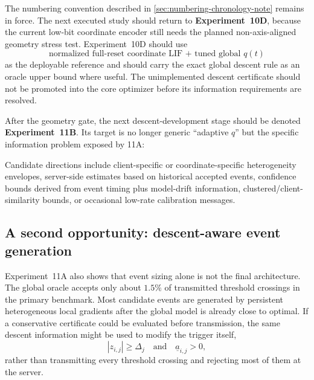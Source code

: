 The numbering convention described in \cref{sec:numbering-chronology-note} remains in force. The next executed study should return to \textbf{Experiment~10D}, because the current low-bit coordinate encoder still needs the planned non-axis-aligned geometry stress test. Experiment~10D should use
\begin{equation}
  \boxed{\text{normalized full-reset coordinate LIF + tuned global }q(t)}
\end{equation}
as the deployable reference and should carry the exact global descent rule as an oracle upper bound where useful. The unimplemented descent certificate should not be promoted into the core optimizer before its information requirements are resolved.

After the geometry gate, the next descent-development stage should be denoted \textbf{Experiment~11B}. Its target is no longer generic ``adaptive $q$'' but the specific information problem exposed by 11A:
\begin{center}
\end{center}
Candidate directions include client-specific or coordinate-specific heterogeneity envelopes, server-side estimates based on historical accepted events, confidence bounds derived from event timing plus model-drift information, clustered/client-similarity bounds, or occasional low-rate calibration messages.

\subsection{A second opportunity: descent-aware event generation}

Experiment~11A also shows that event sizing alone is not the final architecture. The global oracle accepts only about $1.5\%$ of transmitted threshold crossings in the primary benchmark. Most candidate events are generated by persistent heterogeneous local gradients after the global model is already close to optimal. If a conservative certificate could be evaluated before transmission, the same descent information might be used to modify the trigger itself,
\begin{equation}
  |z_{i,j}|\geq\Delta_j
  \quad\text{and}\quad
  \underline a_{i,j}>0,
\end{equation}
rather than transmitting every threshold crossing and rejecting most of them at the server.

